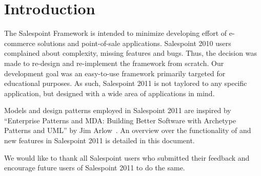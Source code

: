 \chapter{Introduction}
The Salespoint Framework is intended to minimize developing effort of e-commerce solutions and point-of-sale applications.
Salespoint 2010 users complained about complexity, missing features and bugs.
Thus, the decision was made to re-design and re-implement the framework from scratch.
Our development goal was an easy-to-use framework primarily targeted for educational purposes.
As such, Salespoint 2011 is not taylored to any specific application, but designed with a wide area of applications in mind.

Models and design patterns employed in Salespoint 2011 are inspired by ``Enterprise Patterns and MDA: Building Better Software with Archetype Patterns and UML'' by Jim Arlow \,\cite{MDA}.
An overview over the functionality of and new features in Salespoint 2011 is detailed in this document.

We would like to thank all Salespoint users who submitted their feedback and encourage future users of Salespoint 2011 to do the same.
